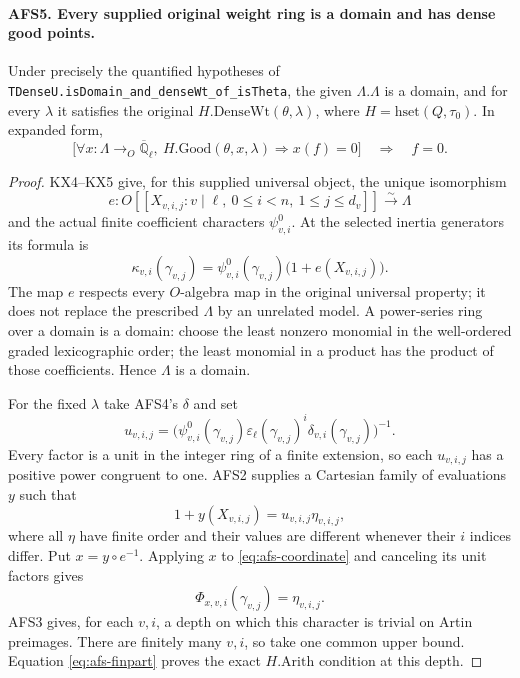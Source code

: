 \documentclass[11pt,a4paper]{article}
\numberwithin{equation}{section}
\theoremstyle{remark}\newtheorem{remark}[theorem]{Remark}
\begin{document}
\paragraph{AFS5. Every supplied original weight ring is a domain and has dense good points.}
\label{claim:AFS5}
Under precisely the quantified hypotheses of
\texttt{TDense\allowbreak U.\allowbreak is\allowbreak Domain\_\allowbreak and\_\allowbreak dense\allowbreak Wt\_\allowbreak of\_\allowbreak is\allowbreak Theta}, the given
$\Lambda.\Lambda$ is a domain, and for every $\lambda$ it
satisfies the original $H.\mathrm{DenseWt}(\theta,\lambda)$,
where $H=\mathrm{hset}(Q,\tau_0)$.  In expanded form,
\[
 \bigl[\forall x:\Lambda\to_O\overline{\mathbb Q}_\ell,
       \ H.\mathrm{Good}(\theta,x,\lambda)\Rightarrow x(f)=0\bigr]
                    \quad\Longrightarrow\quad f=0.
\]
\begin{proof}
KX4--KX5 give, for this supplied universal object, the unique
isomorphism
\[
 e:O[[X_{v,i,j}:v\mid\ell,\ 0\leq i<n,\ 1\leq j\leq d_v]]
                         \overset\sim\longrightarrow\Lambda
\]
and the actual finite coefficient characters $\psi^0_{v,i}$.
At the selected inertia generators its formula is
\begin{equation}\label{eq:afs-coordinate}
 \kappa_{v,i}(\gamma_{v,j})
       =\psi^0_{v,i}(\gamma_{v,j})\bigl(1+e(X_{v,i,j})\bigr).
\end{equation}
The map $e$ respects every $O$-algebra map in the original
universal property; it does not replace the prescribed $\Lambda$
by an unrelated model.  A power-series ring over a domain is a
domain: choose the least nonzero monomial in the well-ordered
graded lexicographic order; the least monomial in a product has
the product of those coefficients.  Hence $\Lambda$ is a domain.

For the fixed $\lambda$ take AFS4's $\delta$ and set
\[
 u_{v,i,j}=
 \bigl(\psi^0_{v,i}(\gamma_{v,j})
       \varepsilon_\ell(\gamma_{v,j})^i
       \delta_{v,i}(\gamma_{v,j})\bigr)^{-1}.
\]
Every factor is a unit in the integer ring of a finite extension,
so each $u_{v,i,j}$ has a positive power congruent to one.
AFS2 supplies a Cartesian family of evaluations $y$ such that
\[
 1+y(X_{v,i,j})=u_{v,i,j}\eta_{v,i,j},
\]
where all $\eta$ have finite order and their values are
different whenever their $i$ indices differ.  Put
$x=y\circ e^{-1}$.  Applying $x$ to
\eqref{eq:afs-coordinate} and canceling its unit factors gives
\begin{equation}\label{eq:afs-torsionvalues}
             \Phi_{x,v,i}(\gamma_{v,j})=\eta_{v,i,j}.
\end{equation}
AFS3 gives, for each $v,i$, a depth on which this character
is trivial on Artin preimages.  There are finitely many
$v,i$, so take one common upper bound.  Equation
\eqref{eq:afs-finpart} proves the exact $H.\mathrm{Arith}$
condition at this depth.


\end{proof}
\end{document}
